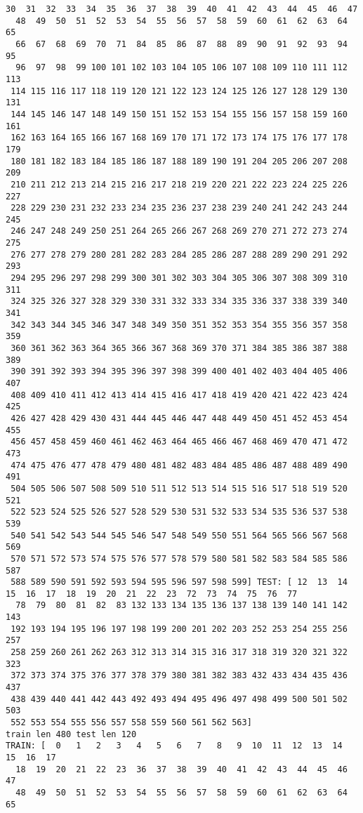 \documentclass[11pt]{article}
\begin{document}
\begin{Verbatim}[commandchars=\\\{\}]
  30  31  32  33  34  35  36  37  38  39  40  41  42  43  44  45  46  47
  48  49  50  51  52  53  54  55  56  57  58  59  60  61  62  63  64  65
  66  67  68  69  70  71  84  85  86  87  88  89  90  91  92  93  94  95
  96  97  98  99 100 101 102 103 104 105 106 107 108 109 110 111 112 113
 114 115 116 117 118 119 120 121 122 123 124 125 126 127 128 129 130 131
 144 145 146 147 148 149 150 151 152 153 154 155 156 157 158 159 160 161
 162 163 164 165 166 167 168 169 170 171 172 173 174 175 176 177 178 179
 180 181 182 183 184 185 186 187 188 189 190 191 204 205 206 207 208 209
 210 211 212 213 214 215 216 217 218 219 220 221 222 223 224 225 226 227
 228 229 230 231 232 233 234 235 236 237 238 239 240 241 242 243 244 245
 246 247 248 249 250 251 264 265 266 267 268 269 270 271 272 273 274 275
 276 277 278 279 280 281 282 283 284 285 286 287 288 289 290 291 292 293
 294 295 296 297 298 299 300 301 302 303 304 305 306 307 308 309 310 311
 324 325 326 327 328 329 330 331 332 333 334 335 336 337 338 339 340 341
 342 343 344 345 346 347 348 349 350 351 352 353 354 355 356 357 358 359
 360 361 362 363 364 365 366 367 368 369 370 371 384 385 386 387 388 389
 390 391 392 393 394 395 396 397 398 399 400 401 402 403 404 405 406 407
 408 409 410 411 412 413 414 415 416 417 418 419 420 421 422 423 424 425
 426 427 428 429 430 431 444 445 446 447 448 449 450 451 452 453 454 455
 456 457 458 459 460 461 462 463 464 465 466 467 468 469 470 471 472 473
 474 475 476 477 478 479 480 481 482 483 484 485 486 487 488 489 490 491
 504 505 506 507 508 509 510 511 512 513 514 515 516 517 518 519 520 521
 522 523 524 525 526 527 528 529 530 531 532 533 534 535 536 537 538 539
 540 541 542 543 544 545 546 547 548 549 550 551 564 565 566 567 568 569
 570 571 572 573 574 575 576 577 578 579 580 581 582 583 584 585 586 587
 588 589 590 591 592 593 594 595 596 597 598 599] TEST: [ 12  13  14  15  16  17  18  19  20  21  22  23  72  73  74  75  76  77
  78  79  80  81  82  83 132 133 134 135 136 137 138 139 140 141 142 143
 192 193 194 195 196 197 198 199 200 201 202 203 252 253 254 255 256 257
 258 259 260 261 262 263 312 313 314 315 316 317 318 319 320 321 322 323
 372 373 374 375 376 377 378 379 380 381 382 383 432 433 434 435 436 437
 438 439 440 441 442 443 492 493 494 495 496 497 498 499 500 501 502 503
 552 553 554 555 556 557 558 559 560 561 562 563]
train len 480 test len 120
TRAIN: [  0   1   2   3   4   5   6   7   8   9  10  11  12  13  14  15  16  17
  18  19  20  21  22  23  36  37  38  39  40  41  42  43  44  45  46  47
  48  49  50  51  52  53  54  55  56  57  58  59  60  61  62  63  64  65

\end{Verbatim}
\end{document}
